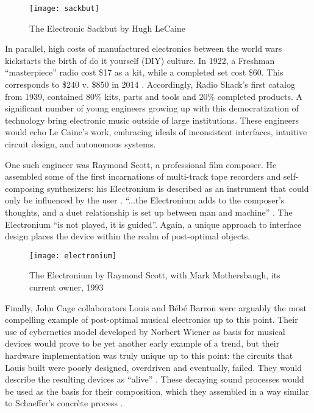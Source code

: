 \begin{figure}[H]
	  	  \centering
	    \texttt{[image: sackbut]}
	    \caption{The Electronic Sackbut by Hugh LeCaine}
	\end{figure}

In parallel, high costs of manufactured electronics between the world wars kickstarts the birth of do it yourself (DIY) culture. In 1922, a Freshman “masterpiece” radio cost \$17 as a kit, while a completed set cost \$60. This corresponds to \$240 v. \$850 in 2014 \citep{radioblvd2014, data.blgs.gov2014}. Accordingly, Radio Shack’s first catalog  from 1939, contained 80\% kits, parts and tools and 20\% completed products. A significant number of young engineers growing up with this democratization of technology bring electronic music outside of large institutions. These engineers would echo Le Caine's work, embracing ideals of inconsistent interfaces, intuitive circuit design, and autonomous systems. 

One such engineer was Raymond Scott, a professional film composer. He assembled  some of the first incarnations of multi-track tape recorders and self-composing synthesizers: his Electronium is described as an instrument that could only be influenced by the user \citep[p.142]{holmes2002}. ``...the Electronium adds to the composer's thoughts, and a duet relationship is set up between man and machine'' \citep{chusid1999}. The Electronium ``is not played, it is guided''\citep{darter1984}. Again, a unique approach to interface design places the device within the realm of post-optimal objects.  

	\begin{figure}[H]
	  \centering
	    \texttt{[image: electronium]}
	     \caption{The Electronium by Raymond Scott, with Mark Mothersbaugh, its current owner, 1993}
	\end{figure}

Finally, John Cage collaborators Louis and Bébé Barron were arguably the most compelling example of post-optimal musical electronics up to this point. Their use of  cybernetics model developed by Norbert Wiener \citep{wiener1965} as basis for musical devices would prove to be yet another early example of a trend, but their hardware implementation was truly unique up to this point: the circuits that Louis built were poorly designed, overdriven and eventually, failed. They would describe the resulting devices as ``alive'' \citep{barron2009}. These decaying sound processes would be used as the basis for their composition, which they assembled in a way similar to Schaeffer’s concrète process \citep{dunbar2010}.

